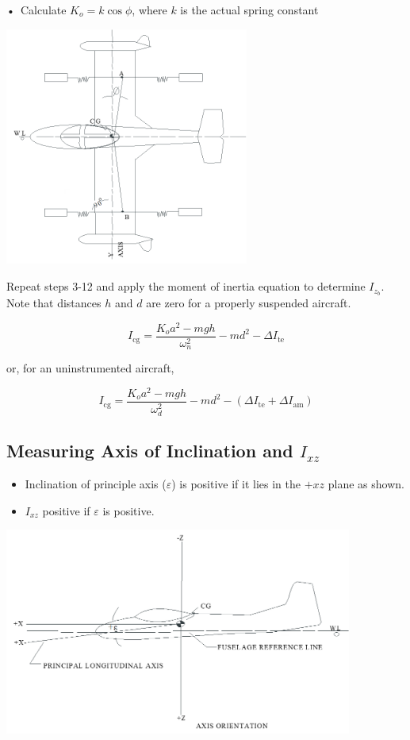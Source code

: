 \documentclass[
]{book}
\providecommand{\tightlist}{%
  \setlength{\itemsep}{0pt}\setlength{\parskip}{0pt}}
\begin{document}
•~Calculate \(K_o = k \cos{\phi}\), where \(k\) is the actual spring constant

\includegraphics[width=3.15625in,height=3.08333in]{media/07/image38.png}

Repeat steps 3-12 and apply the moment of inertia equation to determine \(I_{z_b}\). Note that distances \(h\) and \(d\) are zero for a properly suspended aircraft.

\[ I_{\mathrm{cg}} = \frac{K_o a^2 - mgh}{\omega_n^2} - md^2 - \Delta I_{\mathrm{te}} \]

or, for an uninstrumented aircraft,

\[ I_{\mathrm{cg}} = \frac{K_o a^2 - mgh}{\omega_d^2} - md^2 - \left(\Delta I_{\mathrm{te}} + \Delta I_{\mathrm{am}} \right) \]

\hypertarget{measuring-axis-of-inclination-and-i_xz}{%
\subsection{\texorpdfstring{Measuring Axis of Inclination and \(I_{xz}\)}{Measuring Axis of Inclination and I\_\{xz\}}}\label{measuring-axis-of-inclination-and-i_xz}}

\begin{itemize}
\tightlist
\item
  Inclination of principle axis (\(\varepsilon\)) is positive if it lies in the \(+xz\) plane as shown.
\item
  \(I_{xz}\) positive if \(\varepsilon\) is positive.
\end{itemize}

\includegraphics[width=4.5in,height=2.67708in]{media/07/image41.png}
\end{document}
